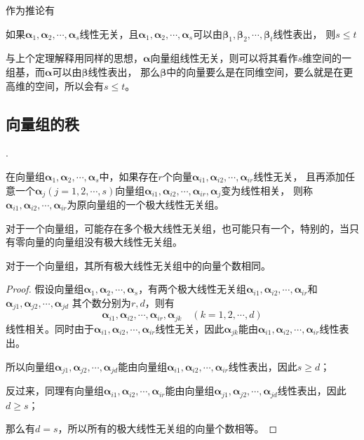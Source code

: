 作为推论有
\begin{theorem}
    如果$\bm{\alpha}_1,\bm{\alpha}_2,\cdots,\bm{\alpha}_s$线性无关，且$\bm{\alpha}_1,\bm{\alpha}_2,\cdots,\bm{\alpha}_s$可以由$\bm{\beta}_1,\bm{\beta}_2,\cdots,\bm{\beta}_t$线性表出，
    则$s\leq t$
\end{theorem}
与上个定理解释用同样的思想，$\bm{\alpha}$向量组线性无关，则可以将其看作$s$维空间的一组基，而$\bm{\alpha}$可以由$\bm{\beta}$线性表出，
那么$\bm{\beta}$中的向量要么是在同维空间，要么就是在更高维的空间，所以会有$s\leq t$。

\subsection{向量组的秩}
.
\begin{definition}
    在向量组$\bm{\alpha}_1,\bm{\alpha}_2,\cdots,\bm{\alpha}_s$中，如果存在$r$个向量$\bm{\alpha}_{i1},\bm{\alpha}_{i2},\cdots,\bm{\alpha}_{ir}$线性无关，
    且再添加任意一个$\bm{\alpha}_j(j=1,2,\cdots,s)$向量组$\bm{\alpha}_{i1},\bm{\alpha}_{i2},\cdots,\bm{\alpha}_{ir},\bm{\alpha}_j$变为线性相关，
    则称$\bm{\alpha}_{i1},\bm{\alpha}_{i2},\cdots,\bm{\alpha}_{ir}$为原向量组的一个极大线性无关组。
\end{definition}

对于一个向量组，可能存在多个极大线性无关组，也可能只有一个，特别的，当只有零向量的向量组没有极大线性无关组。
\begin{theorem}
    对于一个向量组，其所有极大线性无关组中的向量个数相同。
\end{theorem}
\begin{proof}
    假设向量组$\bm{\alpha}_1,\bm{\alpha}_2,\cdots,\bm{\alpha}_s$，有两个极大线性无关组$\bm{\alpha}_{i1},\bm{\alpha}_{i2},\cdots,\bm{\alpha}_{ir}$和$\bm{\alpha}_{j1},\bm{\alpha}_{j2},\cdots,\bm{\alpha}_{jd}$
    其个数分别为$r,d$，则有
    \[ \bm{\alpha}_{i1},\bm{\alpha}_{i2},\cdots,\bm{\alpha}_{ir},\bm{\alpha}_{jk}\quad (k=1,2,\cdots,d) \]
    线性相关。同时由于$\bm{\alpha}_{i1},\bm{\alpha}_{i2},\cdots,\bm{\alpha}_{ir}$线性无关，因此$\bm{\alpha}_{jk}$能由$\bm{\alpha}_{i1},\bm{\alpha}_{i2},\cdots,\bm{\alpha}_{ir}$线性表出。

    所以向量组$\bm{\alpha}_{j1},\bm{\alpha}_{j2},\cdots,\bm{\alpha}_{jd}$能由向量组$\bm{\alpha}_{i1},\bm{\alpha}_{i2},\cdots,\bm{\alpha}_{ir}$线性表出，因此$s\geq d$；

    反过来，同理有向量组$\bm{\alpha}_{i1},\bm{\alpha}_{i2},\cdots,\bm{\alpha}_{ir}$能由向量组$\bm{\alpha}_{j1},\bm{\alpha}_{j2},\cdots,\bm{\alpha}_{jd}$线性表出，因此$d\geq s$；

    那么有$d=s$，所以所有的极大线性无关组的向量个数相等。
\end{proof}

